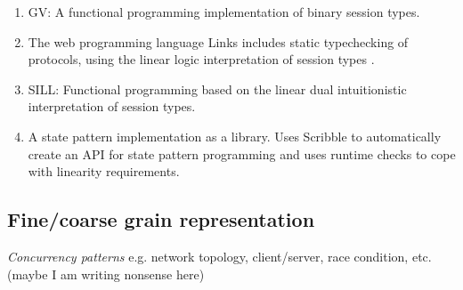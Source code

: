 \begin{enumerate}
	\item	GV:			A functional programming implementation of binary session types. 
	\item	The web programming language Links \cite{} includes static typechecking of protocols, using the linear logic interpretation of session types \cite{}. 
	\item	SILL:		Functional programming based on the linear dual intuitionistic interpretation of session types. 

	\item	A state pattern implementation as a library. Uses Scribble to automatically
			create an API for state pattern programming and uses runtime checks to
			cope with linearity requirements.

\end{enumerate}

\subsection{Fine/coarse grain representation}

{\em Concurrency patterns} e.g. network topology, client/server, race condition, etc. (maybe I am writing nonsense here)
